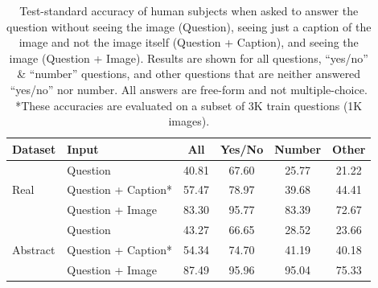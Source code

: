 \begin{table}[t]
\setlength{\tabcolsep}{3.2pt}
{\small
\begin{center}
\begin{tabular}{@{}llcccc@{}}
\toprule
Dataset & Input & All & Yes/No & Number & Other \\
\midrule
    & Question & 40.81 & 67.60 & 25.77 & 21.22 \\
Real   & Question + Caption* & 57.47 & 78.97 & 39.68 & 44.41 \\
    & Question + Image & 83.30 & 95.77 & 83.39 & 72.67 \\
\midrule
 & Question & 43.27 & 66.65 & 28.52 & 23.66 \\
Abstract & Question + Caption* & 54.34 & 74.70 & 41.19 & 40.18 \\
 & Question + Image & 87.49 & 95.96 & 95.04 & 75.33 \\
\bottomrule
\end{tabular}
\end{center}
}
\caption {Test-standard accuracy of human subjects when asked to answer the 
question without seeing the image (Question), 
seeing just a caption of the image and not the image itself (Question + Caption), 
and seeing the image (Question + Image). 
Results are shown for all questions, ``yes/no'' \& ``number'' questions, and other questions 
that are neither answered ``yes/no'' nor number. 
All answers are free-form and not multiple-choice. 
*\hspace{1pt}These accuracies are evaluated on a subset of 3K train questions (1K images).}
\label{table:commonsense_acc}
\end{table}


